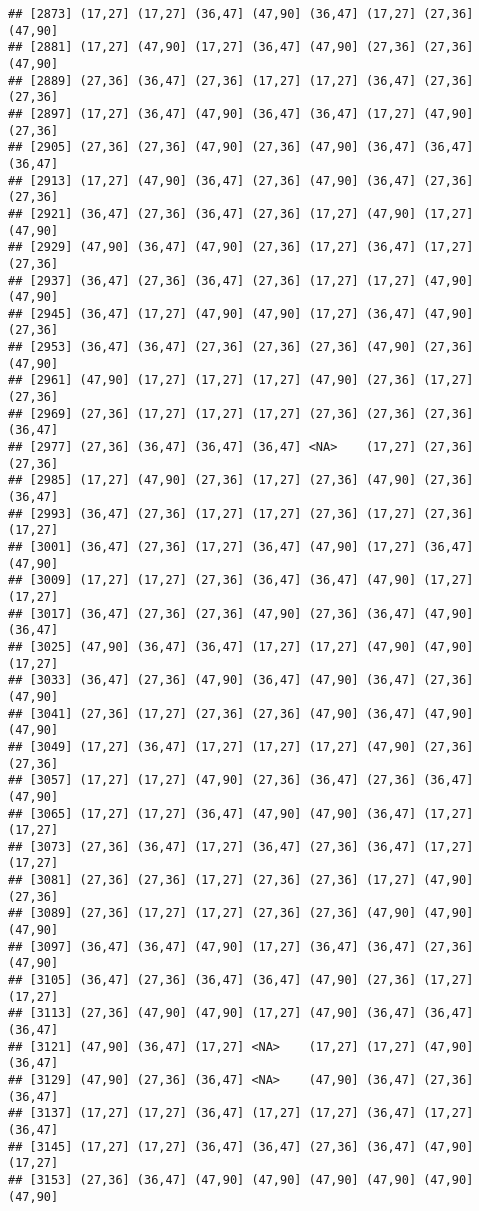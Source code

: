 \documentclass[12pt,]{article}
\begin{document}
\begin{verbatim}
## [2873] (17,27] (17,27] (36,47] (47,90] (36,47] (17,27] (27,36] (47,90]
## [2881] (17,27] (47,90] (17,27] (36,47] (47,90] (27,36] (27,36] (47,90]
## [2889] (27,36] (36,47] (27,36] (17,27] (17,27] (36,47] (27,36] (27,36]
## [2897] (17,27] (36,47] (47,90] (36,47] (36,47] (17,27] (47,90] (27,36]
## [2905] (27,36] (27,36] (47,90] (27,36] (47,90] (36,47] (36,47] (36,47]
## [2913] (17,27] (47,90] (36,47] (27,36] (47,90] (36,47] (27,36] (27,36]
## [2921] (36,47] (27,36] (36,47] (27,36] (17,27] (47,90] (17,27] (47,90]
## [2929] (47,90] (36,47] (47,90] (27,36] (17,27] (36,47] (17,27] (27,36]
## [2937] (36,47] (27,36] (36,47] (27,36] (17,27] (17,27] (47,90] (47,90]
## [2945] (36,47] (17,27] (47,90] (47,90] (17,27] (36,47] (47,90] (27,36]
## [2953] (36,47] (36,47] (27,36] (27,36] (27,36] (47,90] (27,36] (47,90]
## [2961] (47,90] (17,27] (17,27] (17,27] (47,90] (27,36] (17,27] (27,36]
## [2969] (27,36] (17,27] (17,27] (17,27] (27,36] (27,36] (27,36] (36,47]
## [2977] (27,36] (36,47] (36,47] (36,47] <NA>    (17,27] (27,36] (27,36]
## [2985] (17,27] (47,90] (27,36] (17,27] (27,36] (47,90] (27,36] (36,47]
## [2993] (36,47] (27,36] (17,27] (17,27] (27,36] (17,27] (27,36] (17,27]
## [3001] (36,47] (27,36] (17,27] (36,47] (47,90] (17,27] (36,47] (47,90]
## [3009] (17,27] (17,27] (27,36] (36,47] (36,47] (47,90] (17,27] (17,27]
## [3017] (36,47] (27,36] (27,36] (47,90] (27,36] (36,47] (47,90] (36,47]
## [3025] (47,90] (36,47] (36,47] (17,27] (17,27] (47,90] (47,90] (17,27]
## [3033] (36,47] (27,36] (47,90] (36,47] (47,90] (36,47] (27,36] (47,90]
## [3041] (27,36] (17,27] (27,36] (27,36] (47,90] (36,47] (47,90] (47,90]
## [3049] (17,27] (36,47] (17,27] (17,27] (17,27] (47,90] (27,36] (27,36]
## [3057] (17,27] (17,27] (47,90] (27,36] (36,47] (27,36] (36,47] (47,90]
## [3065] (17,27] (17,27] (36,47] (47,90] (47,90] (36,47] (17,27] (17,27]
## [3073] (27,36] (36,47] (17,27] (36,47] (27,36] (36,47] (17,27] (17,27]
## [3081] (27,36] (27,36] (17,27] (27,36] (27,36] (17,27] (47,90] (27,36]
## [3089] (27,36] (17,27] (17,27] (27,36] (27,36] (47,90] (47,90] (47,90]
## [3097] (36,47] (36,47] (47,90] (17,27] (36,47] (36,47] (27,36] (47,90]
## [3105] (36,47] (27,36] (36,47] (36,47] (47,90] (27,36] (17,27] (17,27]
## [3113] (27,36] (47,90] (47,90] (17,27] (47,90] (36,47] (36,47] (36,47]
## [3121] (47,90] (36,47] (17,27] <NA>    (17,27] (17,27] (47,90] (36,47]
## [3129] (47,90] (27,36] (36,47] <NA>    (47,90] (36,47] (27,36] (36,47]
## [3137] (17,27] (17,27] (36,47] (17,27] (17,27] (36,47] (17,27] (36,47]
## [3145] (17,27] (17,27] (36,47] (36,47] (27,36] (36,47] (47,90] (17,27]
## [3153] (27,36] (36,47] (47,90] (47,90] (47,90] (47,90] (47,90] (47,90]

\end{verbatim}
\end{document}
